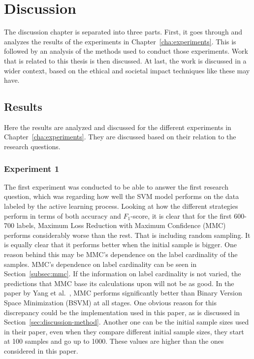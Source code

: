 \chapter{Discussion}
\label{cha:discussion}

The discussion chapter is separated into three parts.
First, it goes through and analyzes the results of the experiments in Chapter~\ref{cha:experiments}.
This is followed by an analysis of the methods used to conduct those experiments.
Work that is related to this thesis is then discussed.
At last, the work is discussed in a wider context, based on the ethical and societal impact techniques like these may have.

\section{Results}
\label{sec:discussion-results}

Here the results are analyzed and discussed for the different experiments in Chapter~\ref{cha:experiments}.
They are discussed based on their relation to the research questions.

\subsection{Experiment 1}

The first experiment was conducted to be able to answer the first research question, which was regarding how well the SVM model performs on the data labeled by the active learning process.
Looking at how the different strategies perform in terms of both accuracy and $F_1$-score, it is clear that for the first 600-700 labels, Maximum Loss Reduction with Maximum Confidence (MMC) performs considerably worse than the rest.
That is including random sampling.
It is equally clear that it performs better when the initial sample is bigger.
One reason behind this may be MMC's dependence on the label cardinality of the samples.
MMC's dependence on label cardinality can be seen in Section~\ref{subsec:mmc}.
If the information on label cardinality is not varied, the predictions that MMC base its calculations upon will not be as good.
In the paper by Yang et al\@.~\cite{yang2009effective}, MMC performs significantly better than Binary Version Space Minimization (BSVM) at all stages.
One obvious reason for this discrepancy could be the implementation used in this paper, as is discussed in Section~\ref{sec:discussion-method}.
Another one can be the initial sample sizes used in their paper, even when they compare different initial sample sizes, they start at 100 samples and go up to 1000.
These values are higher than the ones considered in this paper.

